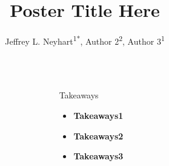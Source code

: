 \documentclass[final]{beamer}
\title{Poster Title Here} %
\author{ Jeffrey L. Neyhart\textsuperscript{1*}, Author 2\textsuperscript{2}, Author 3\textsuperscript{1} } %
\institute{ \textsuperscript{1}Affiliate1, \textsuperscript{2}Affiliate2 }
\newlength{\sepwid}
\newlength{\onecolwid}
\begin{document}

\setlength{\belowcaptionskip}{2ex} %
\setlength\belowdisplayshortskip{2ex} %

\begin{frame}[t] %

\begin{columns}[t] %


\begin{column}{\sepwid}\end{column} %

\begin{column}{\onecolwid} %




\begin{alertblock}{\Large{Takeaways}}

\begin{itemize}
  \item \textbf{Takeaways1}
  \vspace{0.5cm}
  \item \textbf{Takeaways2}
  \vspace{0.5cm}
  \item \textbf{Takeaways3}
\end{itemize}


\end{alertblock}



\end{column}
\end{columns}
\end{frame}
\end{document}
